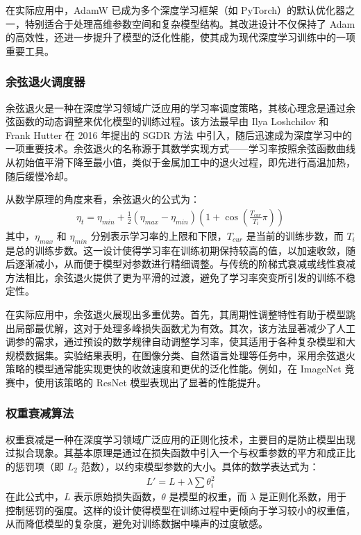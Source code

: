 在实际应用中，AdamW 已成为多个深度学习框架（如 PyTorch）的默认优化器之一，特别适合于处理高维参数空间和复杂模型结构。其改进设计不仅保持了 Adam 的高效性，还进一步提升了模型的泛化性能，使其成为现代深度学习训练中的一项重要工具。

\subsubsection{余弦退火调度器}

余弦退火是一种在深度学习领域广泛应用的学习率调度策略，其核心理念是通过余弦函数的动态调整来优化模型的训练过程。该方法最早由 Ilya Loshchilov 和 Frank Hutter 在 2016 年提出的 SGDR 方法 \cite{SGDR} 中引入，随后迅速成为深度学习中的一项重要技术。余弦退火的名称源于其数学实现方式——学习率按照余弦函数曲线从初始值平滑下降至最小值，类似于金属加工中的退火过程，即先进行高温加热，随后缓慢冷却。

从数学原理的角度来看，余弦退火的公式为：
\begin{align}
\eta_t = \eta_{min} + \frac{1}{2}(\eta_{max} - \eta_{min})(1 + \cos(\frac{T_{cur}}{T_i}\pi))
\end{align}
其中，\(\eta_{max}\) 和 \(\eta_{min}\) 分别表示学习率的上限和下限，\(T_{cur}\) 是当前的训练步数，而 \(T_i\) 是总的训练步数。这一设计使得学习率在训练初期保持较高的值，以加速收敛，随后逐渐减小，从而便于模型对参数进行精细调整。与传统的阶梯式衰减或线性衰减方法相比，余弦退火提供了更为平滑的过渡，避免了学习率突变所引发的训练不稳定性。

在实际应用中，余弦退火展现出多重优势。首先，其周期性调整特性有助于模型跳出局部最优解，这对于处理多峰损失函数尤为有效。其次，该方法显著减少了人工调参的需求，通过预设的数学规律自动调整学习率，使其适用于各种复杂模型和大规模数据集。实验结果表明，在图像分类、自然语言处理等任务中，采用余弦退火策略的模型通常能实现更快的收敛速度和更优的泛化性能。例如，在 ImageNet 竞赛中，使用该策略的 ResNet 模型表现出了显著的性能提升。

\subsubsection{权重衰减算法}

权重衰减是一种在深度学习领域广泛应用的正则化技术，主要目的是防止模型出现过拟合现象。其基本原理是通过在损失函数中引入一个与权重参数的平方和成正比的惩罚项（即 \( L_2 \) 范数），以约束模型参数的大小。具体的数学表达式为：
\begin{align}
L' = L + \lambda \sum \theta_i^2
\end{align}
在此公式中，\( L \) 表示原始损失函数，\(\theta\) 是模型的权重，而 \(\lambda\) 是正则化系数，用于控制惩罚的强度。这样的设计使得模型在训练过程中更倾向于学习较小的权重值，从而降低模型的复杂度，避免对训练数据中噪声的过度敏感。


